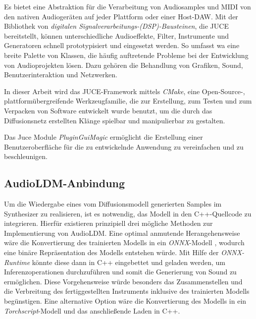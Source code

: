\documentclass[
  a4paper,  %
  twoside,  %
  bibliography=totoc,
  headsepline,
  cleardoublepage=empty,
  parskip=half,
  draft=false
]{scrbook}
\begin{document}
Es bietet eine Abstraktion für die Verarbeitung von Audiosamples und MIDI von den nativen Audiogeräten auf jeder Plattform oder einer Host-DAW. Mit der Bibliothek von \emph{digitalen Signalverarbeitungs-(DSP)-Bausteinen}, die JUCE bereitstellt, können unterschiedliche Audioeffekte, Filter, Instrumente und Generatoren schnell prototypisiert und eingesetzt werden. \cite{noauthor_juce_nodate-1} So umfasst wa eine breite Palette von Klassen, die häufig auftretende Probleme bei der Entwicklung von Audioprojekten lösen. Dazu gehören die Behandlung von Grafiken, Sound, Benutzerinteraktion und Netzwerken. \cite{robinson_getting_2013}

In dieser Arbeit wird das JUCE-Framework mittels \emph{CMake}, \glqq eine Open-Source-, plattformübergreifende Werkzeugfamilie, die zur Erstellung, zum Testen und zum Verpacken von Software entwickelt wurde\grqq \cite{noauthor_cmake_nodate} benutzt, um die durch das Diffusionsnetz erstellten Klänge spielbar und manipulierbar zu gestalten. 

Das Juce Module \emph{PluginGuiMagic} \cite{walz_plugin_nodate} ermöglicht die Erstellung einer Benutzeroberfläche für die zu entwickelnde Anwendung zu vereinfachen und zu beschleunigen. 


\subsection{AudioLDM-Anbindung} \label{sec:api}
Um die Wiedergabe eines vom Diffusionsmodell generierten Samples im Synthesizer zu realisieren, ist es notwendig, das Modell in den C++-Quellcode zu integrieren. Hierfür existieren prinzipiell drei mögliche Methoden zur Implementierung von AudioLDM. Eine optimal anmutende Herangehensweise wäre die Konvertierung des trainierten Modells in ein \emph{ONNX}-Modell \cite{noauthor_onnx_nodate-1}, wodurch eine binäre Repräsentation des Modells entstehen würde. Mit Hilfe der \emph{ONNX-Runtime} \cite{noauthor_onnx_nodate} könnte diese dann in C++ eingebettet und geladen werden, um Inferenzoperationen durchzuführen und somit die Generierung von Sound zu ermöglichen. Diese Vorgehensweise würde besonders das Zusammenstellen und die Verbreitung des fertiggestellten Instruments inklusive des trainierten Modells begünstigen. Eine alternative Option wäre die Konvertierung des Modells in ein \emph{Torchscript}-Modell \cite{noauthor_torchscript_nodate} und das anschließende Laden in C++. \cite{oli_larkin_machine_2023} 
\end{document}
